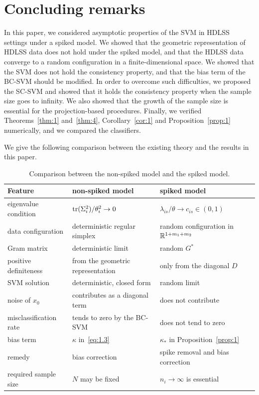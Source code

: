 \section{Concluding remarks}
\label{sec:conclude}

In this paper, we considered asymptotic properties of the SVM in HDLSS settings
under a spiked model. We showed that the geometric representation of HDLSS data
does not hold under the spiked model, and that the HDLSS data converge to a random
configuration in a finite-dimensional space. We showed that the SVM does not hold
the consistency property, and that the bias term of the BC-SVM should be modified.
In order to overcome such difficulties, we proposed the SC-SVM and showed that it
holds the consistency property when the sample size goes to infinity. We also
showed that the growth of the sample size is essential for the projection-based
procedures. Finally, we verified Theorems~\ref{thm:1} and~\ref{thm:4},
Corollary~\ref{cor:1} and Proposition~\ref{prop:1} numerically, and we compared the
classifiers.

We give the following comparison between the existing theory and the results in
this paper.

\begin{table}[ht]
\centering
\caption{Comparison between the non-spiked model and the spiked model.}
\label{tab:model-compare}
\begin{tabular}{@{}p{3.2cm}p{5.2cm}p{5.2cm}@{}}
\toprule
Feature & non-spiked model & spiked model \\
\midrule
eigenvalue condition
& $\operatorname{tr}(\Sigma_i^2)/\theta_i^2\to 0$
& $\lambda_{is}/\theta\to c_{is}\in(0,1)$ \\
data configuration
& deterministic regular simplex
& random configuration in $\mathbb{R}^{1+m_1+m_2}$ \\
Gram matrix
& deterministic limit
& random $G^*$ \\
positive definiteness
& from the geometric representation
& only from the diagonal $D$ \\
SVM solution
& deterministic, closed form
& random limit \\
noise of $x_0$
& contributes as a diagonal term
& does not contribute \\
misclassification rate
& tends to zero by the BC-SVM
& does not tend to zero \\
bias term
& $\kappa$ in~\eqref{eq:1.3}
& $\kappa_*$ in Proposition~\ref{prop:1} \\
remedy
& bias correction
& spike removal and bias correction \\
required sample size
& $N$ may be fixed
& $n_i\to\infty$ is essential \\
\bottomrule
\end{tabular}
\end{table}

